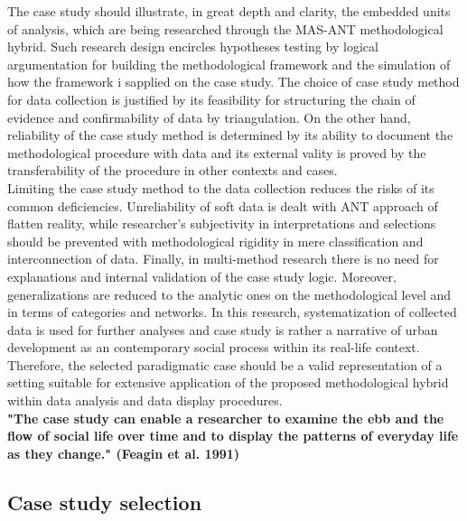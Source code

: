 \documentclass[11pt]{report}
\begin{document}
The case study should illustrate, in great depth and clarity, the embedded units of analysis, which are being researched through the MAS-ANT methodological hybrid. Such research design encircles hypotheses testing by logical argumentation for building the methodological framework and the simulation of how the framework i sapplied on the case study. The choice of case study method for data collection is justified by its feasibility for structuring the chain of evidence and confirmability of data by triangulation. On the other hand, reliability of the case study method is determined by its ability to document the methodological procedure with data and its external vality is proved by the transferability of the procedure in other contexts and cases.
\\
Limiting the case study method to the data collection reduces the risks of its common deficiencies. Unreliability of soft data is dealt with ANT approach of flatten reality, while researcher's subjectivity in interpretations and selections should be prevented with methodological rigidity in mere classification and interconnection of data. Finally, in multi-method research there is no need for explanations and internal validation of the case study logic. Moreover, generalizations are reduced to the analytic ones on the methodological level and in terms of categories and networks. In this research, systematization of collected data is used for further analyses and case study is rather a narrative of urban development as an contemporary social process within its real-life context. Therefore, the selected paradigmatic case should be a valid representation of a setting suitable for extensive application of the proposed methodological hybrid within data analysis and data display procedures.
\\
\textbf{"The case study can enable a researcher to examine the ebb and the flow of social life over time and to display the patterns of everyday life as they change." (Feagin et al. 1991)}

\subsection{Case study selection}
\end{document}
